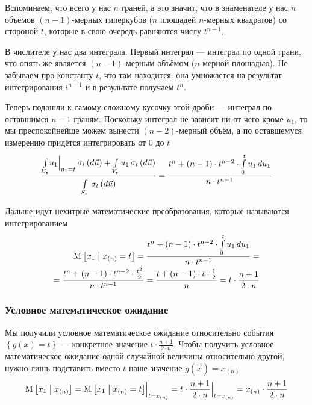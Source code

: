 Вспоминаем, что всего у нас $n$ граней, а это значит, что в знаменателе
у нас $n$ объёмов $\left( n-1 \right)$-мерных гиперкубов
($n$ площадей $n$-мерных квадратов)
со стороной $t$, которые в свою очередь равняются числу $t^{n-1}$.

В числителе у нас два интеграла.
Первый интеграл --- интеграл по одной грани, что опять же является
$\left( n-1 \right)$-мерным объёмом ($n$-мерной площадью).
Не забываем про константу $t$, что там находится: она умножается
на результат интегрирования $t^{n-1}$ и в результате получаем $t^n$.

Теперь подошли к самому сложному кусочку этой дроби ---
интеграл по оставшимся $n-1$ граням.
Поскольку интеграл не зависит ни от чего кроме $u_1$, то мы преспокойнейше
можем вынести $\left( n-2 \right)$-мерный объём, а по оставшемуся измерению
придётся интегрировать от $0$ до $t$
$$\frac{\integrall{U_t}{\sigma_{t}\left(d\vec{u} \right)}{
        \Bigl. u_1 \Bigr|_{u_1 = t}}
            + \integrall{Y_t}{\sigma_{t}\left(d\vec{u} \right)}{
                u_1}}{
        \integrall{S_t}{\sigma_{t}\left(d\vec{u} \right)}{}}
    = \frac{t^n + \left( n-1 \right) \cdot t^{n-2}
        \cdot \integral{0}{t}{u_1}{u_1}}{n \cdot t^{n-1}}$$

Дальше идут нехитрые математические преобразования,
которые называются интегрированием
\begin{align*}
    \Mean{x_1 \mcond x_{\left( n \right)} = t}
    = \frac{t^n + \left( n-1 \right) \cdot t^{n-2} 
        \cdot \integral{0}{t}{u_1}{u_1}}{n \cdot t^{n-1}} = \\
    = \frac{t^n + \left( n-1 \right) \cdot t^{n-2}
        \cdot \frac{t^2}{2}}{n \cdot t^{n-1}}
    = \frac{t + \left( n-1 \right) \cdot t \cdot \frac{1}{2}}{n}
    = t \cdot \frac{n+1}{2 \cdot n}
\end{align*}

\subsubsection{Условное математическое ожидание}
Мы получили условное математическое ожидание относительно события
$\left\{ g\left( x \right) = t \right\}$ --- конкретное значение
$t \cdot \frac{n+1}{2 \cdot n}$.
Чтобы получить условное математическое ожидание одной случайной величины
относительно другой, нужно лишь подставить вместо $t$
наше значение $g\left( \vec{x} \right) = x_{\left( n \right)}$
$$\Mean{x_1 \mcond x_{\left( n \right)}}
    = \Bigl. \Mean{x_1 \mcond x_{\left( n \right)} = t}
        \Bigr|_{t = x_{\left( n \right)}}
    = \Bigl. t \cdot \frac{n+1}{2 \cdot n} \Bigr|_{t = x_{\left( n \right)}}
    = x_{\left( n \right)} \cdot \frac{n+1}{2 \cdot n}$$

